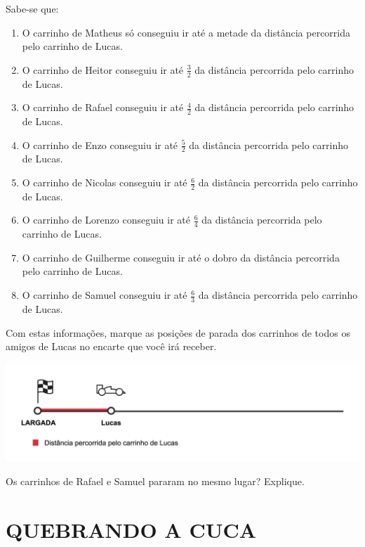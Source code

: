 Sabe-se que:

\begin{enumerate} [\quad a)] %
  \item     O carrinho de Matheus só conseguiu ir até a metade da distância percorrida pelo carrinho de Lucas.
  \item     O carrinho de Heitor conseguiu ir até     $\frac{3}{2}$     da distância percorrida pelo carrinho de Lucas. 
  \item     O carrinho de Rafael conseguiu ir até     $\frac{4}{2}$     da distância percorrida pelo carrinho de Lucas.
  \item     O carrinho de Enzo conseguiu ir até     $\frac{5}{2}$     da distância percorrida pelo carrinho de Lucas. 
  \item     O carrinho de Nicolas conseguiu ir até     $\frac{6}{2}$     da distância percorrida pelo carrinho de Lucas. 
  \item     O carrinho de Lorenzo conseguiu ir até     $\frac{6}{4}$     da distância percorrida pelo carrinho de Lucas. 
  \item     O carrinho de Guilherme conseguiu ir até o dobro da distância percorrida pelo carrinho de Lucas.
  \item     O carrinho de Samuel conseguiu ir até     $\frac{6}{3}$     da distância percorrida pelo carrinho de Lucas. 
\end{enumerate} %


Com estas informações, marque as posições de parada dos carrinhos de todos os amigos de Lucas no encarte que você irá receber.

\begin{center}
\includegraphics[width=450pt, keepaspectratio]{..//media/cap2/secoes/pngs_licao_02/ativ12_fig01.png} 
\end{center}


Os carrinhos de Rafael e Samuel pararam no mesmo lugar? Explique.

\section{QUEBRANDO A CUCA }

